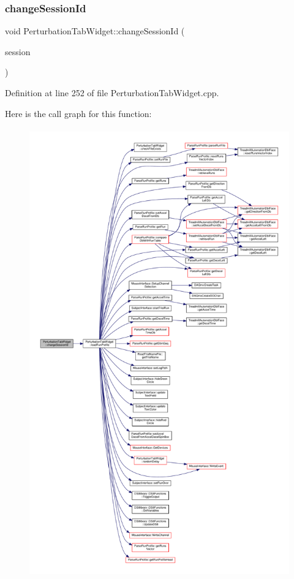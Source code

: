 \subsubsection{\texorpdfstring{change\+Session\+Id}{changeSessionId}}
{\footnotesize\ttfamily void Perturbation\+Tab\+Widget\+::change\+Session\+Id (\begin{DoxyParamCaption}\item[{Q\+String}]{session }\end{DoxyParamCaption})\hspace{0.3cm}{\ttfamily [slot]}}



Definition at line 252 of file Perturbation\+Tab\+Widget.\+cpp.

Here is the call graph for this function\+:
\nopagebreak
\begin{figure}[H]
\begin{center}
\leavevmode
\includegraphics[height=550pt]{class_perturbation_tab_widget_a9d551ffcaf3d0ebe54015f5536d261ab_cgraph}
\end{center}
\end{figure}
